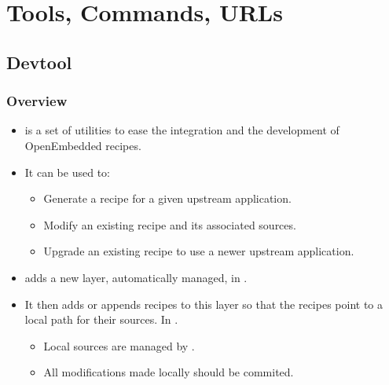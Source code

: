 \section{Tools, Commands, URLs}

\subsection{Devtool}

\begin{frame}
  \frametitle{Overview}
  \begin{itemize}
    \item {} is a set of utilities to ease the integration
    and the development of OpenEmbedded recipes.
    \item It can be used to:
      \begin{itemize}
        \item Generate a recipe for a given upstream application.
        \item Modify an existing recipe and its associated sources.
        \item Upgrade an existing recipe to use a newer upstream
          application.
      \end{itemize}
    \item {} adds a new layer, automatically managed, in
      .
    \item It then adds or appends recipes to this layer so that the
      recipes point to a local path for their sources. In
      .
      \begin{itemize}
        \item Local sources are managed by .
        \item All modifications made locally should be commited.
      \end{itemize}
  \end{itemize}
\end{frame}

